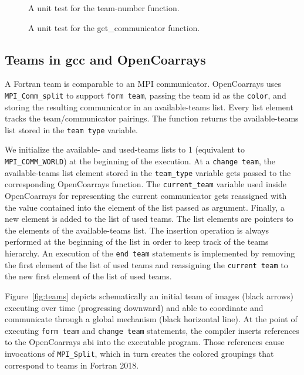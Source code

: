 \begin{figure}
  
  \vspace{-12pt}
  \caption{A unit test for the team-number function.\label{fig:team-number-test}}
\end{figure}

\begin{figure}
  
  \vspace{-12pt}
  \caption{A unit test for the get\_communicator function.\label{fig:get-communicator-test}}
\end{figure}

\subsection{Teams in \gls{gcc} and OpenCoarrays}\label{subsec:teams-in-gcc}
A Fortran team is comparable to an MPI communicator. OpenCoarrays uses
\texttt{MPI\_Comm\_split} to support
\texttt{form team}, passing
the team id as the \texttt{color},
and storing the resulting communicator in an available-teams list.
Every list element tracks the team/communicator pairings.
The function returns the available-teams list stored in the \texttt{team type} variable.

We initialize the available- and used-teams lists to 1 (equivalent to \texttt{MPI\_COMM\_WORLD}) at the beginning of the execution.
At a \texttt{change team}, the available-teams list element stored in the \texttt{team\_type} variable
gets passed to the corresponding OpenCoarrays function. The \texttt{current\_team} variable used inside OpenCoarrays for
representing the current communicator gets reassigned with the value contained into the element of the list passed as argument.
Finally, a new element is added to the list of used teams. The list elements are pointers to the elements of the available-teams list.
The insertion operation is always performed at the beginning of the list in order to keep track of the teams hierarchy.
An execution of the \texttt{end team} statements is implemented by removing the first element of the list of used teams and reassigning the
\texttt{current team} to the new first element of the list of used teams.

Figure~\ref{fig:teams} depicts schematically an initial team of images (black arrows) executing over time (progressing
downward) and able to coordinate and communicate through a global mechanism (black horizontal line).  At the point of executing
\texttt{form team} and \texttt{change team} statements, the compiler inserts references to the OpenCoarrays \gls{abi} into the
executable program.  Those references cause invocations of \texttt{MPI\_Split}, which in turn creates the colored groupings that
correspond to teams in Fortran 2018.

